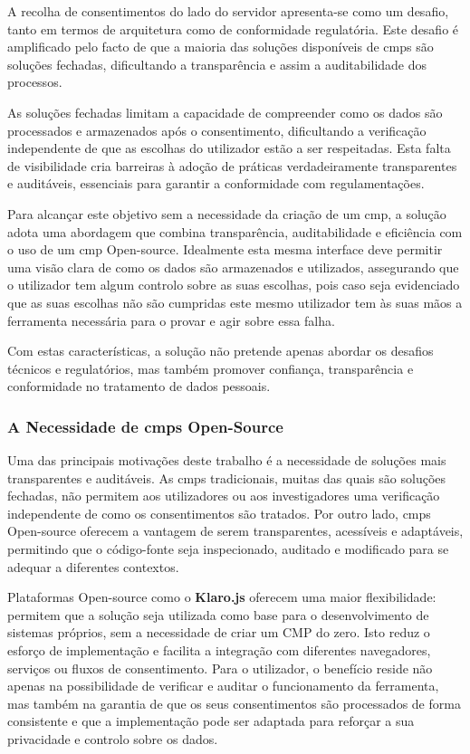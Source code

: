 A recolha de consentimentos do lado do servidor apresenta-se como um desafio, tanto em termos de arquitetura como de conformidade regulatória. Este desafio é amplificado pelo facto de que a maioria das soluções disponíveis de \acrshort{cmp}s são soluções fechadas, dificultando a transparência e assim a auditabilidade dos processos.

As soluções fechadas limitam a capacidade de compreender como os dados são processados e armazenados após o consentimento, dificultando a verificação independente de que as escolhas do utilizador estão a ser respeitadas. Esta falta de visibilidade cria barreiras à adoção de práticas verdadeiramente transparentes e auditáveis, essenciais para garantir a conformidade com regulamentações.

Para alcançar este objetivo sem a necessidade da criação de um \acrshort{cmp}, a solução adota uma abordagem que combina transparência, auditabilidade e eficiência com o uso de um \acrshort{cmp} Open-source. Idealmente esta mesma interface deve permitir uma visão clara de como os dados são armazenados e utilizados, assegurando que o utilizador tem algum controlo sobre as suas escolhas, pois caso seja evidenciado que as suas escolhas não são cumpridas este mesmo utilizador tem às suas mãos a ferramenta necessária para o provar e agir sobre essa falha.

Com estas características, a solução não pretende apenas abordar os desafios técnicos e regulatórios, mas também promover confiança, transparência e conformidade no tratamento de dados pessoais.


\subsubsection{A Necessidade de \acrshort{cmp}s Open-Source}

Uma das principais motivações deste trabalho é a necessidade de soluções mais transparentes e auditáveis. As \acrshort{cmp}s tradicionais, muitas das quais são soluções fechadas, não permitem aos utilizadores ou aos investigadores uma verificação independente de como os consentimentos são tratados. Por outro lado, \acrshort{cmp}s Open-source oferecem a vantagem de serem transparentes, acessíveis e adaptáveis, permitindo que o código-fonte seja inspecionado, auditado e modificado para se adequar a diferentes contextos.

Plataformas Open-source como o \textbf{Klaro.js} oferecem uma maior flexibilidade: permitem que a solução seja utilizada como base para o desenvolvimento de sistemas próprios, sem a necessidade de criar um CMP do zero. Isto reduz o esforço de implementação e facilita a integração com diferentes navegadores, serviços ou fluxos de consentimento. Para o utilizador, o benefício reside não apenas na possibilidade de verificar e auditar o funcionamento da ferramenta, mas também na garantia de que os seus consentimentos são processados de forma consistente e que a implementação pode ser adaptada para reforçar a sua privacidade e controlo sobre os dados.

